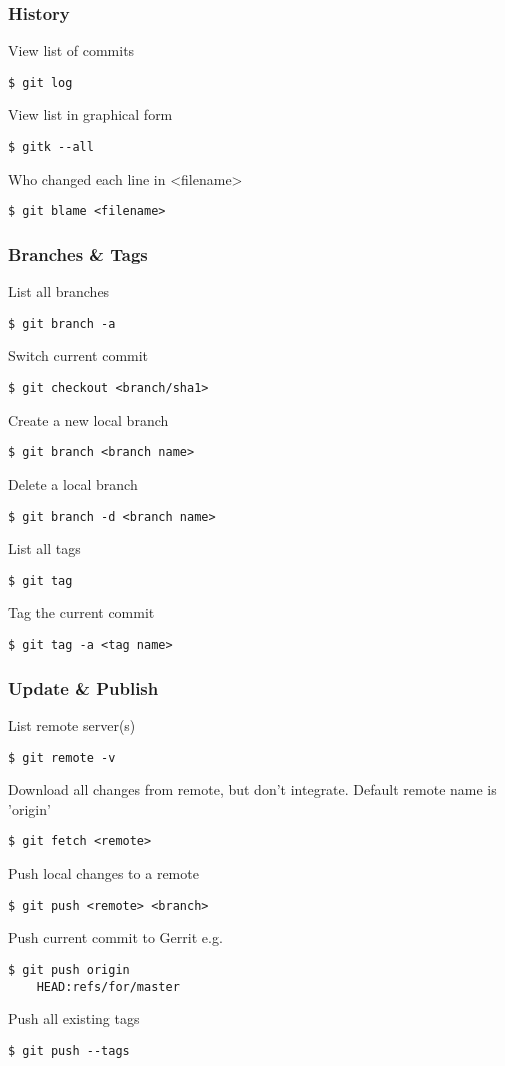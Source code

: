 \begin{multicols}{2}
\subsubsection*{History}
View list of commits
\begin{lstlisting}
$ git log
\end{lstlisting}
View list in graphical form
\begin{lstlisting}
$ gitk --all
\end{lstlisting}
Who changed each line in <filename>
\begin{lstlisting}
$ git blame <filename>
\end{lstlisting}

\subsubsection*{Branches \& Tags}
List all branches
\begin{lstlisting}
$ git branch -a
\end{lstlisting}
Switch current commit
\begin{lstlisting}
$ git checkout <branch/sha1>
\end{lstlisting}
Create a new local branch
\begin{lstlisting}
$ git branch <branch name>
\end{lstlisting}
Delete a local branch
\begin{lstlisting}
$ git branch -d <branch name>
\end{lstlisting}
List all tags
\begin{lstlisting}
$ git tag
\end{lstlisting}
Tag the current commit
\begin{lstlisting}
$ git tag -a <tag name>
\end{lstlisting}

\subsubsection*{Update \& Publish}
List remote server(s)
\begin{lstlisting}
$ git remote -v
\end{lstlisting}
Download all changes from remote, but don't integrate.  Default remote name is 'origin'
\begin{lstlisting}
$ git fetch <remote>
\end{lstlisting}
Push local changes to a remote
\begin{lstlisting}
$ git push <remote> <branch>
\end{lstlisting}
Push current commit to Gerrit e.g.
\begin{lstlisting}
$ git push origin
    HEAD:refs/for/master
\end{lstlisting}
Push all existing tags
\begin{lstlisting}
$ git push --tags
\end{lstlisting}


\end{multicols}
